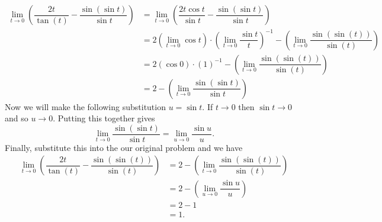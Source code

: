 \documentclass{hwset}
\begin{document}
\be
\item
\begin{solution}
		\begin{align*}
			\lim_{t\to0}\left(\dfrac{2t}{\tan(t)}-\dfrac{\sin(\sin t)}{\sin t}\right)
				&= \lim_{t\to0}\left(\dfrac{2t \cos t}{\sin t} -
					\dfrac{\sin(\sin t)}{\sin t}\right) \\
			&= 2 \left(\lim_{t\to0} \cos t\right) \cdot \left(\lim_{t\to 0}
				\dfrac{\sin t}{t}\right)^{-1} - \left(\lim_{t\to 0}
				\dfrac{\sin(\sin(t))}{\sin(t)}\right) \\
			&= 2 (\cos 0) \cdot (1)^{-1} - \left(\lim_{t\to 0} \dfrac{\sin(\sin(t))}{\sin(t)}\right) \\
			&= 2 - \left(\lim_{t\to 0} \dfrac{\sin(\sin t)}{\sin t}\right) 
		\end{align*}
		Now we will make the following substitution $u = \sin t$. If $t \to 0$ then
		$\sin t \to 0$ and so $u \to 0$. Putting this together gives
		\begin{equation*}
			\lim_{t\to 0} \dfrac{\sin(\sin t)}{\sin t} = \lim_{u\to 0} \dfrac{\sin
			u}{u}.
		\end{equation*}
		Finally, substitute this into the our original problem and we have
		\begin{align*}
			\lim_{t\to0}\left(\dfrac{2t}{\tan(t)}-\dfrac{\sin(\sin(t))}{\sin(t)}\right)
				&= 2 - \left(\lim_{t\to 0} \dfrac{\sin(\sin(t))}{\sin(t)}\right) \\ 
			&= 2 - \left(\lim_{u\to 0} \dfrac{\sin u}{u}\right) \\
			&= 2 - 1 \\
			&= \boxed{1.}
		\end{align*}
\end{solution}
\end{document}
